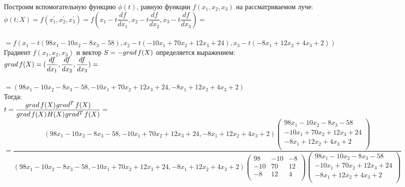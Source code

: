 \documentclass[14pt,a4paper,fleqn]{extarticle}
\begin{document}
	Построим вспомогательную функцию $\phi(t)$, равную функции $f(x_1, x_2, x_3)$ на рассматриваемом луче:\\
	
	$\phi(t;X) = f(x_1^{'}, x_2^{'}, x_3^{'}) = f(x_1 - t \dfrac{df}{dx_1}, x_2 - t \dfrac{df}{dx_2}, x_3 - t \dfrac{df}{dx_3}) = $\\\\
	\footnotesize $ = f(x_1 - t(98x_1 - 10x_2 - 8x_3 - 58), x_2 - t(-10x_1 + 70x_2 + 12x_3 + 24), x_3 - t(-8x_1 + 12x_2 + 4x_3 + 2))$\\
	
	\normalsize Градиент $f(x_1,x_2,x_3)$ и вектор $S = -grad\hspace*{0.05cm}f(X)$ определяется выражением:\\
	$grad\hspace*{0.05cm}f(X) = (\dfrac{df}{dx_1}, \dfrac{df}{dx_2}, \dfrac{df}{dx_3}) =$\\\\
	$= (98x_1 - 10x_2 - 8x_3 - 58, -10x_1 + 70x_2 + 12x_3 + 24, -8x_1 + 12x_2 + 4x_3 + 2)$\\
	
	Тогда:\\
	
	$t = \dfrac{grad \hspace*{0.05cm} f(X)\hspace*{0.02cm}grad^T \hspace*{0.05cm} f(X)}{grad \hspace*{0.05cm} f(X)\hspace*{0.02cm}H(X)\hspace*{0.02cm}grad^T \hspace*{0.05cm} f(X)} =$\\
	\scriptsize $ = \dfrac{(98x_1 - 10x_2 - 8x_3 - 58, -10x_1 + 70x_2 + 12x_3 + 24, -8x_1 + 12x_2 + 4x_3 + 2)\begin{pmatrix} 98x_1 - 10x_2 - 8x_3 - 58\\ -10x_1 + 70x_2 + 12x_3 + 24\\ -8x_1 + 12x_2 + 4x_3 + 2\\ \end{pmatrix}}{(98x_1 - 10x_2 - 8x_3 - 58, -10x_1 + 70x_2 + 12x_3 + 24, -8x_1 + 12x_2 + 4x_3 + 2)\begin{pmatrix} 98 & -10 & -8\\ -10 & 70 & 12\\ -8 & 12 & 4\\ \end{pmatrix}\begin{pmatrix} 98x_1 - 10x_2 - 8x_3 - 58\\ -10x_1 + 70x_2 + 12x_3 + 24\\ -8x_1 + 12x_2 + 4x_3 + 2\\ \end{pmatrix}}$\\
	
\end{document}
